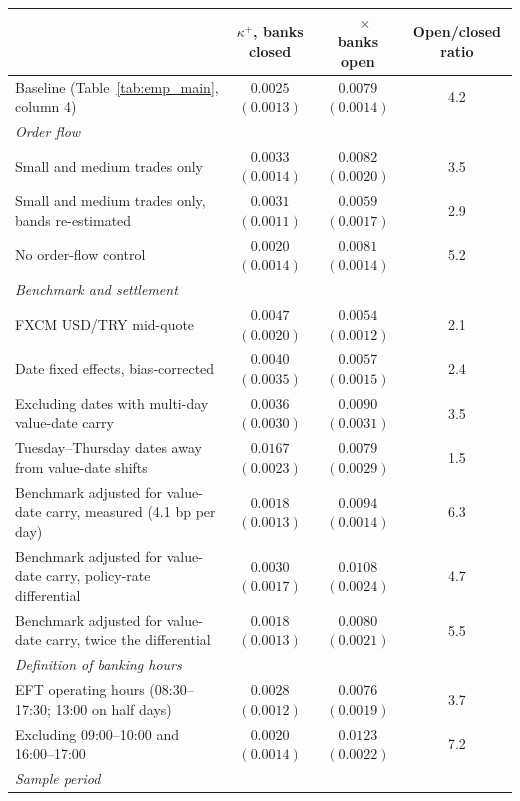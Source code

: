 \begin{tabular}{lccc}
\toprule
 & $\kappa^+$, banks closed & $\quad\times$ banks open & Open/closed ratio \\
\midrule
Baseline (Table~\ref{tab:emp_main}, column 4) & $0.0025$ $(0.0013)$ & $0.0079$ $(0.0014)$ & 4.2 \\
\multicolumn{4}{l}{\emph{Order flow}} \\
\quad Small and medium trades only & $0.0033$ $(0.0014)$ & $0.0082$ $(0.0020)$ & 3.5 \\
\quad Small and medium trades only, bands re-estimated & $0.0031$ $(0.0011)$ & $0.0059$ $(0.0017)$ & 2.9 \\
\quad No order-flow control & $0.0020$ $(0.0014)$ & $0.0081$ $(0.0014)$ & 5.2 \\
\multicolumn{4}{l}{\emph{Benchmark and settlement}} \\
\quad FXCM USD/TRY mid-quote & $0.0047$ $(0.0020)$ & $0.0054$ $(0.0012)$ & 2.1 \\
\quad Date fixed effects, bias-corrected & $0.0040$ $(0.0035)$ & $0.0057$ $(0.0015)$ & 2.4 \\
\quad Excluding dates with multi-day value-date carry & $0.0036$ $(0.0030)$ & $0.0090$ $(0.0031)$ & 3.5 \\
\quad Tuesday--Thursday dates away from value-date shifts & $0.0167$ $(0.0023)$ & $0.0079$ $(0.0029)$ & 1.5 \\
\quad Benchmark adjusted for value-date carry, measured (4.1 bp per day) & $0.0018$ $(0.0013)$ & $0.0094$ $(0.0014)$ & 6.3 \\
\quad Benchmark adjusted for value-date carry, policy-rate differential & $0.0030$ $(0.0017)$ & $0.0108$ $(0.0024)$ & 4.7 \\
\quad Benchmark adjusted for value-date carry, twice the differential & $0.0018$ $(0.0013)$ & $0.0080$ $(0.0021)$ & 5.5 \\
\multicolumn{4}{l}{\emph{Definition of banking hours}} \\
\quad EFT operating hours (08:30--17:30; 13:00 on half days) & $0.0028$ $(0.0012)$ & $0.0076$ $(0.0019)$ & 3.7 \\
\quad Excluding 09:00--10:00 and 16:00--17:00 & $0.0020$ $(0.0014)$ & $0.0123$ $(0.0022)$ & 7.2 \\
\multicolumn{4}{l}{\emph{Sample period}} \\

\end{tabular}
